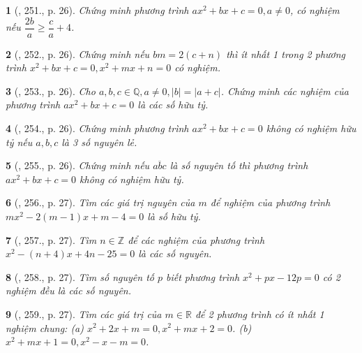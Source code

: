 \documentclass{article}
\newtheorem{baitoan}{}
\begin{document}
\begin{baitoan}[\cite{Binh_Toan_9_tap_2}, 251., p. 26]
	Chứng minh phương trình $ax^2 + bx + c = 0,a\ne0$, có nghiệm nếu $\dfrac{2b}{a}\ge\dfrac{c}{a} + 4$.
\end{baitoan}

\begin{baitoan}[\cite{Binh_Toan_9_tap_2}, 252., p. 26]
	Chứng minh nếu $bm = 2(c + n)$ thì ít nhất 1 trong 2 phương trình $x^2 + bx + c = 0,x^2 + mx + n = 0$ có nghiệm.
\end{baitoan}

\begin{baitoan}[\cite{Binh_Toan_9_tap_2}, 253., p. 26]
	Cho $a,b,c\in\mathbb{Q},a\ne0,|b| = |a + c|$. Chứng minh các nghiệm của phương trình $ax^2 + bx + c = 0$ là các số hữu tỷ.
\end{baitoan}

\begin{baitoan}[\cite{Binh_Toan_9_tap_2}, 254., p. 26]
	Chứng minh phương trình $ax^2 + bx + c = 0$ không có nghiệm hữu tỷ nếu $a,b,c$ là 3 số nguyên lẻ.
\end{baitoan}

\begin{baitoan}[\cite{Binh_Toan_9_tap_2}, 255., p. 26]
	Chứng minh nếu $\overline{abc}$ là số nguyên tố thì phương trình $ax^2 + bx + c = 0$ không có nghiệm hữu tỷ.
\end{baitoan}

\begin{baitoan}[\cite{Binh_Toan_9_tap_2}, 256., p. 27]
	Tìm các giá trị nguyên của $m$ để nghiệm của phương trình $mx^2 - 2(m - 1)x + m - 4 = 0$ là số hữu tỷ.
\end{baitoan}

\begin{baitoan}[\cite{Binh_Toan_9_tap_2}, 257., p. 27]
	Tìm $n\in\mathbb{Z}$ để các nghiệm của phương trình $x^2 - (n + 4)x + 4n - 25 = 0$ là các số nguyên.
\end{baitoan}

\begin{baitoan}[\cite{Binh_Toan_9_tap_2}, 258., p. 27]
	Tìm số nguyên tố $p$ biết phương trình $x^2 + px - 12p = 0$ có 2 nghiệm đều là các số nguyên.
\end{baitoan}

\begin{baitoan}[\cite{Binh_Toan_9_tap_2}, 259., p. 27]
	Tìm các giá trị của $m\in\mathbb{R}$ để 2 phương trình có ít nhất 1 nghiệm chung: (a) $x^2 + 2x + m = 0,x^2 + mx + 2 = 0$. (b) $x^2 + mx + 1 = 0,x^2 - x - m = 0$.
\end{baitoan}
\end{document}
